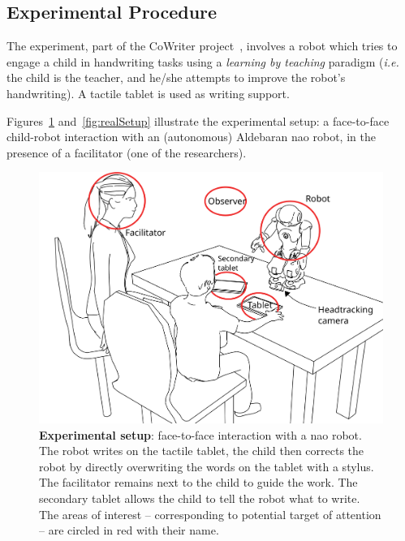 \documentclass{sig-alternate}
\newcommand{\ie}{\textit{i.e.}\xspace}
\begin{document}
\subsection{Experimental Procedure}

The experiment, part of the CoWriter project~\cite{Hood:2015}, involves a robot
which tries to engage a child in handwriting tasks using a \emph{learning by
teaching} paradigm (\ie the child is the teacher, and he/she attempts to improve
the robot's handwriting). A tactile tablet is used as writing support.

Figures~\ref{fig:setup} and~\ref{fig:realSetup} illustrate the experimental
setup: a face-to-face child-robot interaction with an (autonomous) Aldebaran
{\sc nao} robot, in the presence of a facilitator (one of the researchers).

\begin{figure}[h!]
    \centering
    \includegraphics[width=0.8\columnwidth]{experimental_setup}
    \caption{\small \textbf{Experimental setup}: face-to-face interaction with a {\sc
            nao} robot. The robot writes on the tactile tablet, the child then
            corrects the robot by directly overwriting the words on the tablet
            with a stylus. The facilitator remains next to the child to guide the work. 
            The secondary tablet allows the child to tell the robot what to
            write. The areas of interest -- corresponding to potential target of
            attention -- are circled in red with their name.}
    \label{fig:setup}
\end{figure}
\end{document}
